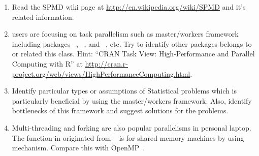 \begin{enumerate}[label=\thechapter-\arabic*]
\item
Read the SPMD wiki page at
\url{http://en.wikipedia.org/wiki/SPMD}
and it's related information.

\item
{} users are focusing on task parallelism such as
master/workers framework
including packages
~\citep{Tierney2012},
~\citep{parallel}, and
~\citep{Rmpi}, etc.
Try to identify other packages belongs to or related this class.
{\color{blue}Hint:
``CRAN Task View: High-Performance and Parallel Computing with R'' at
\url{http://cran.r-project.org/web/views/HighPerformanceComputing.html}.
}

\item
Identify particular types or assumptions of Statistical problems which is
particularly beneficial by using the master/workers framework.
Also, identify bottlenecks of this framework and suggest solutions
for the problems.

\item
Multi-threading
and forking
are also popular parallelisms in personal laptop.
The function 
in  originated
from ~\citep{multicore}
is for shared memory machines by using
 mechanism.
Compare this with OpenMP~\citep{OpenMP}.


\end{enumerate}

